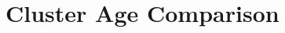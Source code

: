 \documentclass[11pt,twocolumn,tighten,linenumbers,trackchanges]{aastex63}
\newcommand{\nkeplerstars}{$\approx$160{,}000}
\begin{document}
%
%
%




\section{Cluster Age Comparison}
\label{sec:litagecomparison}
\end{document}
